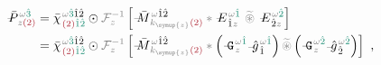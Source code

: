 \begin{subequations} \label{eq:DP^(2)-3_12-spectrum-G}
\begin{align}
	\Xint{\mathcolor{gray}{-}}{30}{\bar{P}}^{\;\! \mathcolor{gray}{\omega} \textcolor{PineGreen}{\hat{3}} }_{\;\! \mathcolor{gray}{z} \textcolor{Maroon}{(2)} } &= \bar{\chi}^{\;\! \mathcolor{gray}{\omega} \textcolor{PineGreen}{\hat{3}} \hat{1} \hat{2} }_{\;\! \textcolor{Maroon}{(2)} \textcolor{PineGreen}{\hat{1} \hat{2}}} \odot \mathcolor{gray}{\mathcal F_{z}^{-1}} \left[ \Xint{\mathcolor{gray}{-}}{18}{\bar{M}}^{\;\! \mathcolor{gray}{\omega} \hat{1} \hat{2} }_{\;\! \mathcolor{gray}{k_{\symup{z}}} \textcolor{Maroon}{(2)} } \mathcolor{gray}{*} \Xint{\mathcolor{gray}{-}}{295}{E}^{\;\! \mathcolor{gray}{\omega} \textcolor{PineGreen}{\hat{1}}}_{\;\! \hat{1} \mathcolor{gray}{z}} ~\mathcolor{gray}{\widetilde \circledast}~ \Xint{\mathcolor{gray}{-}}{295}{E}^{\;\! \mathcolor{gray}{\omega} \textcolor{PineGreen}{\hat{2}}}_{\;\! \hat{2} \mathcolor{gray}{z}} \right] \label{eq:DP^(2)-3_12-spectrum-G1} \\
	&= \bar{\chi}^{\;\! \mathcolor{gray}{\omega} \textcolor{PineGreen}{\hat{3}} \hat{1} \hat{2} }_{\;\! \textcolor{Maroon}{(2)} \textcolor{PineGreen}{\hat{1} \hat{2}}} \odot \mathcolor{gray}{\mathcal F_{z}^{-1}} \left[ \Xint{\mathcolor{gray}{-}}{18}{\bar{M}}^{\;\! \mathcolor{gray}{\omega} \hat{1} \hat{2} }_{\;\! \mathcolor{gray}{k_{\symup{z}}} \textcolor{Maroon}{(2)} } \mathcolor{gray}{*} \left( \Xint{\mathcolor{gray}{-}}{20}{\mathtt{G}}^{\;\! \mathcolor{gray}{\omega} \textcolor{PineGreen}{\hat{1}}}_{\;\! \mathcolor{gray}{z}} \Xint{{}^{}_{\mathcolor{gray}{-}}}{10}{\hat{g}}^{\;\! \mathcolor{gray}{\omega} \textcolor{PineGreen}{\hat{1}}}_{\;\! \hat{1}} \right) \mathcolor{gray}{\widetilde \circledast} \left( \Xint{\mathcolor{gray}{-}}{20}{\mathtt{G}}^{\;\! \mathcolor{gray}{\omega} \textcolor{PineGreen}{\hat{2}}}_{\;\! \mathcolor{gray}{z}} \Xint{{}^{}_{\mathcolor{gray}{-}}}{10}{\hat{g}}^{\;\! \mathcolor{gray}{\omega} \textcolor{PineGreen}{\hat{2}}}_{\;\! \hat{2}} \right) \right] ~, \label{eq:DP^(2)-3_12-spectrum-G2}
\end{align}
\end{subequations}
